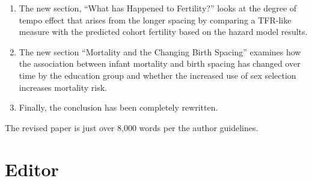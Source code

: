 \documentclass[letterpaper,12pt]{article}
\begin{document}
\begin{enumerate}
\item The new section, ``What has Happened to Fertility?'' looks at the
degree of tempo effect that arises from the longer spacing by comparing
a TFR-like measure with the predicted cohort fertility based on the
hazard model results.

\item The new section ``Mortality and the Changing Birth Spacing''
examines how the association between infant mortality and birth spacing
has changed over time by the education group and whether the increased
use of sex selection increases mortality risk.

\item Finally, the conclusion has been completely rewritten.
\end{enumerate}

The revised paper is just over 8,000 words per the author guidelines.



\section*{Editor}
\end{document}
